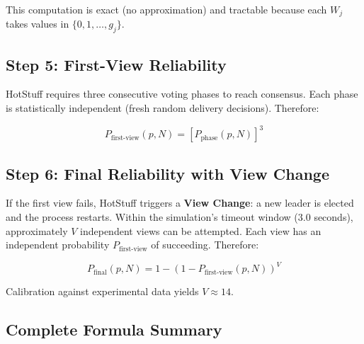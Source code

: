 \documentclass[12pt,a4paper]{article}
\begin{document}
This computation is exact (no approximation) and tractable because each $W_j$ takes values in $\{0, 1, \ldots, g_j\}$.

\subsection{Step 5: First-View Reliability}

HotStuff requires three consecutive voting phases to reach consensus. Each phase is statistically independent (fresh random delivery decisions). Therefore:

\begin{equation}
  \boxed{P_{\text{first-view}}(p, N) = \left[P_{\text{phase}}(p, N)\right]^3}
  \label{eq:Pfv}
\end{equation}

\subsection{Step 6: Final Reliability with View Change}

If the first view fails, HotStuff triggers a \textbf{View Change}: a new leader is elected and the process restarts. Within the simulation's timeout window ($3.0$ seconds), approximately $V$ independent views can be attempted. Each view has an independent probability $P_{\text{first-view}}$ of succeeding. Therefore:

\begin{equation}
  \boxed{P_{\text{final}}(p, N) = 1 - \left(1 - P_{\text{first-view}}(p, N)\right)^V}
  \label{eq:Pfinal}
\end{equation}

Calibration against experimental data yields $V \approx 14$.

\subsection{Complete Formula Summary}
\end{document}
